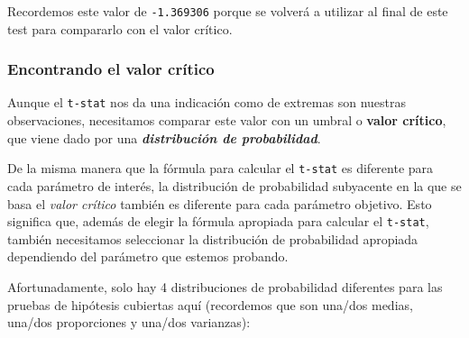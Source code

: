 \documentclass[
]{book}
\begin{document}
Recordemos este valor de \texttt{-1.369306} porque se volverá a utilizar al final de este test para compararlo con el valor crítico.

\hypertarget{encontrando-el-valor-cruxedtico}{%
\subsubsection{Encontrando el valor crítico}\label{encontrando-el-valor-cruxedtico}}

Aunque el \texttt{t-stat} nos da una indicación como de extremas son nuestras observaciones, necesitamos comparar este valor con un umbral o \textbf{valor crítico}, que viene dado por una \textbf{\emph{distribución de probabilidad}}.

De la misma manera que la fórmula para calcular el \texttt{t-stat} es diferente para cada parámetro de interés, la distribución de probabilidad subyacente en la que se basa el \emph{valor crítico} también es diferente para cada parámetro objetivo. Esto significa que, además de elegir la fórmula apropiada para calcular el \texttt{t-stat}, también necesitamos seleccionar la distribución de probabilidad apropiada dependiendo del parámetro que estemos probando.

Afortunadamente, solo hay 4 distribuciones de probabilidad diferentes para las pruebas de hipótesis cubiertas aquí (recordemos que son una/dos medias, una/dos proporciones y una/dos varianzas):
\end{document}
